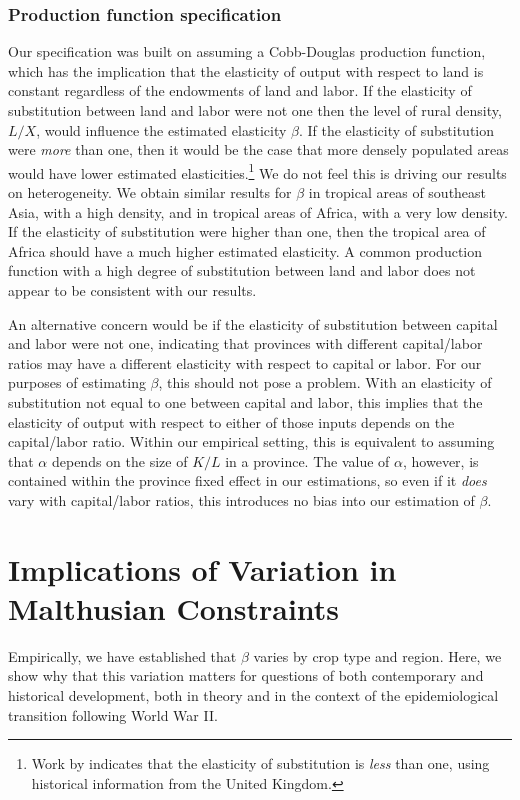 \documentclass[11pt]{article}
\begin{document}
\subsubsection{Production function specification} 
Our specification was built on assuming a Cobb-Douglas production function, which has the implication that the elasticity of output with respect to land is constant regardless of the endowments of land and labor. If the elasticity of substitution between land and labor were not one then the level of rural density, $L/X$, would influence the estimated elasticity $\beta$. If the elasticity of substitution were \textit{more} than one, then it would be the case that more densely populated areas would have lower estimated elasticities.\footnote{Work by \citet{wilde2012} indicates that the elasticity of substitution is \textit{less} than one, using historical information from the United Kingdom.} We do not feel this is driving our results on heterogeneity. We obtain similar results for $\beta$ in tropical areas of southeast Asia, with a high density, and in tropical areas of Africa, with a very low density. If the elasticity of substitution were higher than one, then the tropical area of Africa should have a much higher estimated elasticity. A common production function with a high degree of substitution between land and labor does not appear to be consistent with our results.

An alternative concern would be if the elasticity of substitution between capital and labor were not one, indicating that provinces with different capital/labor ratios may have a different elasticity with respect to capital or labor. For our purposes of estimating $\beta$, this should not pose a problem. With an elasticity of substitution not equal to one between capital and labor, this implies that the elasticity of output with respect to either of those inputs depends on the capital/labor ratio. Within our empirical setting, this is equivalent to assuming that $\alpha$ depends on the size of $K/L$ in a province. The value of $\alpha$, however, is contained within the province fixed effect in our estimations, so even if it \textit{does} vary with capital/labor ratios, this introduces no bias into our estimation of $\beta$.

\section{Implications of Variation in Malthusian Constraints}\label{SEC_implications}
Empirically, we have established that $\beta$ varies by crop type and region. Here, we show why that this variation matters for questions of both contemporary and historical development, both in theory and in the context of the epidemiological transition following World War II. 
\end{document}
